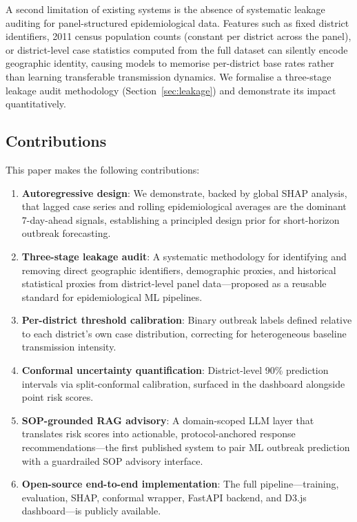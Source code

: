 \documentclass[conference]{IEEEtran}
\begin{document}
A second limitation of existing systems is the absence of systematic
leakage auditing for panel-structured epidemiological data. Features
such as fixed district identifiers, 2011 census population counts
(constant per district across the panel), or district-level case
statistics computed from the full dataset can silently encode
geographic identity, causing models to memorise per-district
base rates rather than learning transferable transmission dynamics.
We formalise a three-stage leakage audit methodology
(Section~\ref{sec:leakage}) and demonstrate its impact quantitatively.

\subsection{Contributions}

This paper makes the following contributions:

\begin{enumerate}
  \item \textbf{Autoregressive design}: We demonstrate, backed by
        global SHAP analysis, that lagged case series and rolling
        epidemiological averages are the dominant 7-day-ahead signals,
        establishing a principled design prior for short-horizon
        outbreak forecasting.

  \item \textbf{Three-stage leakage audit}: A systematic methodology
        for identifying and removing direct geographic identifiers,
        demographic proxies, and historical statistical proxies from
        district-level panel data---proposed as a reusable standard
        for epidemiological ML pipelines.

  \item \textbf{Per-district threshold calibration}: Binary outbreak
        labels defined relative to each district's own case
        distribution, correcting for heterogeneous baseline
        transmission intensity.

  \item \textbf{Conformal uncertainty quantification}: District-level
        90\% prediction intervals via split-conformal calibration,
        surfaced in the dashboard alongside point risk scores.

  \item \textbf{SOP-grounded RAG advisory}: A domain-scoped LLM
        layer that translates risk scores into actionable,
        protocol-anchored response recommendations---the first
        published system to pair ML outbreak prediction with a
        guardrailed SOP advisory interface.

  \item \textbf{Open-source end-to-end implementation}: The full
        pipeline---training, evaluation, SHAP, conformal wrapper,
        FastAPI backend, and D3.js dashboard---is publicly available.
\end{enumerate}
\end{document}

